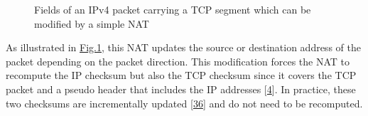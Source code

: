 \documentclass[letterpaper,10pt,english]{sphinxmanual}
\begin{document}
\begin{figure}[htbp]\centering\capstart{}\caption{Fields of an IPv4 packet carrying a TCP segment which can be modified by a simple NAT}\label{\detokenize{mptcp:id79}}\label{\detokenize{mptcp:fig-mptcp-ip4tcp-nat}}\end{figure}
\sphinxAtStartPar
As illustrated in \hyperref[\detokenize{mptcp:fig-mptcp-ip4tcp-nat}]{Fig.\@ \ref{\detokenize{mptcp:fig-mptcp-ip4tcp-nat}}}, this NAT updates the source or destination address of the packet depending on the packet direction. This modification forces the NAT to recompute the IP checksum but also the TCP checksum since it covers the TCP packet and a pseudo header that includes the IP addresses {[}\hyperlink{cite.biblio:id729}{4}{]}. In practice, these two checksums are incrementally updated {[}\hyperlink{cite.biblio:id2952}{36}{]} and do not need to be recomputed.
\end{document}
